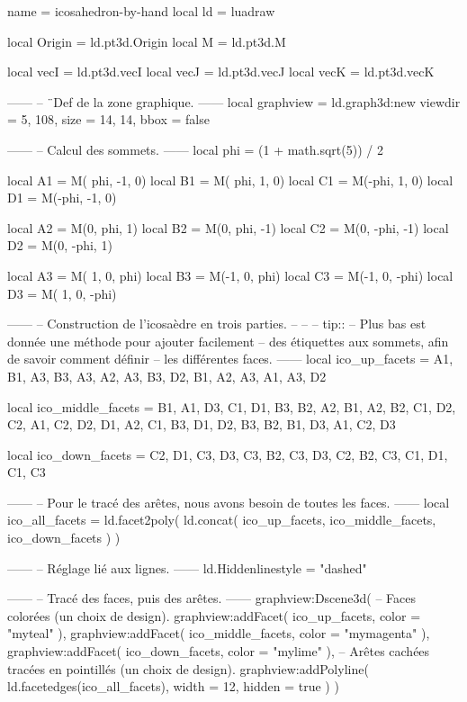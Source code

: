 \documentclass[border = 3pt]{standalone}
\begin{document}
\begin{luadraw*}{name = icosahedron-by-hand}
local ld = luadraw

local Origin = ld.pt3d.Origin
local M      = ld.pt3d.M

local vecI = ld.pt3d.vecI
local vecJ = ld.pt3d.vecJ
local vecK = ld.pt3d.vecK

------
-- ¨Def de la zone graphique.
------
local graphview = ld.graph3d:new{
  viewdir  = {5, 108},
  size     = {14, 14},
  bbox     = false
}

------
-- Calcul des sommets.
------
local phi = (1 + math.sqrt(5)) / 2

local A1 = M( phi, -1, 0)
local B1 = M( phi,  1, 0)
local C1 = M(-phi,  1, 0)
local D1 = M(-phi, -1, 0)

local A2 = M(0,  phi,  1)
local B2 = M(0,  phi, -1)
local C2 = M(0, -phi, -1)
local D2 = M(0, -phi,  1)

local A3 = M( 1, 0,  phi)
local B3 = M(-1, 0,  phi)
local C3 = M(-1, 0, -phi)
local D3 = M( 1, 0, -phi)

------
-- Construction de l'icosaèdre en trois parties.
--
--
-- tip::
--     Plus bas est donnée une méthode pour ajouter facilement
--     des étiquettes aux sommets, afin de savoir comment définir
--     les différentes faces.
------
local ico_up_facets = {
  {A1, B1, A3},
  {B3, A3, A2},
  {A3, B3, D2},
  {B1, A2, A3},
  {A1, A3, D2}
}

local ico_middle_facets = {
  {B1, A1, D3},
  {C1, D1, B3},
  {B2, A2, B1},
  {A2, B2, C1},
  {D2, C2, A1},
  {C2, D2, D1},
  {A2, C1, B3},
  {D1, D2, B3},
  {B2, B1, D3},
  {A1, C2, D3}
}

local ico_down_facets = {
  {C2, D1, C3},
  {D3, C3, B2},
  {C3, D3, C2},
  {B2, C3, C1},
  {D1, C1, C3}
}

------
-- Pour le tracé des arêtes, nous avons besoin de toutes les faces.
------
local ico_all_facets = ld.facet2poly(
  ld.concat(
    ico_up_facets,
    ico_middle_facets,
    ico_down_facets
  )
)

------
-- Réglage lié aux lignes.
------
ld.Hiddenlinestyle = "dashed"

------
-- Tracé des faces, puis des arêtes.
------
graphview:Dscene3d(
-- Faces colorées (un choix de design).
  graphview:addFacet(
    ico_up_facets,
    {color = "myteal"}
  ),
  graphview:addFacet(
    ico_middle_facets,
    {color = "mymagenta"}
  ),
  graphview:addFacet(
    ico_down_facets,
    {color = "mylime"}
  ),
-- Arêtes cachées tracées en pointillés (un choix de design).
  graphview:addPolyline(
    ld.facetedges(ico_all_facets),
    {
      width  = 12,
      hidden = true
    }
  )
)


\end{luadraw*}
\end{document}
